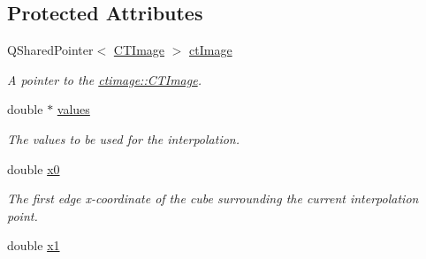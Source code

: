 \subsection*{Protected Attributes}
\begin{DoxyCompactItemize}
\item 
\hypertarget{classassignment_1_1_interpolator3_d_a7a9b457f60bd12527e0402fcab391bf3}{
QSharedPointer$<$ \hyperlink{classctimage_1_1_c_t_image}{CTImage} $>$ \hyperlink{classassignment_1_1_interpolator3_d_a7a9b457f60bd12527e0402fcab391bf3}{ctImage}}
\label{classassignment_1_1_interpolator3_d_a7a9b457f60bd12527e0402fcab391bf3}

\begin{DoxyCompactList}\small\item\em A pointer to the \hyperlink{classctimage_1_1_c_t_image}{ctimage::CTImage}. \item\end{DoxyCompactList}\item 
\hypertarget{classassignment_1_1_interpolator3_d_a061525dc9657ecd0aac93d647398e01f}{
double $\ast$ \hyperlink{classassignment_1_1_interpolator3_d_a061525dc9657ecd0aac93d647398e01f}{values}}
\label{classassignment_1_1_interpolator3_d_a061525dc9657ecd0aac93d647398e01f}

\begin{DoxyCompactList}\small\item\em The values to be used for the interpolation. \item\end{DoxyCompactList}\item 
\hypertarget{classassignment_1_1_interpolator3_d_afb656ddf8789b483a8570f7a93985c0c}{
double \hyperlink{classassignment_1_1_interpolator3_d_afb656ddf8789b483a8570f7a93985c0c}{x0}}
\label{classassignment_1_1_interpolator3_d_afb656ddf8789b483a8570f7a93985c0c}

\begin{DoxyCompactList}\small\item\em The first edge x-\/coordinate of the cube surrounding the current interpolation point. \item\end{DoxyCompactList}\item 
\hypertarget{classassignment_1_1_interpolator3_d_ab8f3111100189b5730621f77fe54467e}{
double \hyperlink{classassignment_1_1_interpolator3_d_ab8f3111100189b5730621f77fe54467e}{x1}}
\label{classassignment_1_1_interpolator3_d_ab8f3111100189b5730621f77fe54467e}


\end{DoxyCompactItemize}
